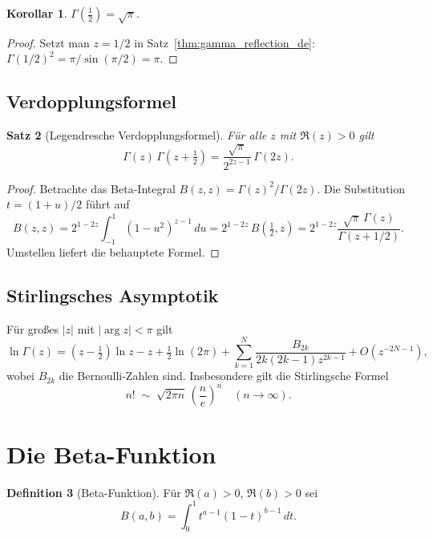 \documentclass[12pt,a4paper]{amsart}
\newtheorem{theorem}{Satz}[section]
\newtheorem{corollary}[theorem]{Korollar}
\theoremstyle{definition}
\newtheorem{definition}[theorem]{Definition}
\begin{document}
\begin{corollary}
\(\Gamma\!\left(\tfrac{1}{2}\right) = \sqrt{\pi}\).
\end{corollary}
\begin{proof}
Setzt man \(z = 1/2\) in Satz~\ref{thm:gamma_reflection_de}: \(\Gamma(1/2)^2 = \pi/\sin(\pi/2) = \pi\).
\end{proof}

\subsection{Verdopplungsformel}

\begin{theorem}[Legendresche Verdopplungsformel]\label{thm:gamma_duplication_de}
Für alle \(z\) mit \(\Re(z) > 0\) gilt
\[
  \Gamma(z)\,\Gamma\!\left(z+\tfrac{1}{2}\right)
  = \frac{\sqrt{\pi}}{2^{2z-1}}\,\Gamma(2z).
\]
\end{theorem}

\begin{proof}
Betrachte das Beta-Integral \(B(z,z) = \Gamma(z)^2/\Gamma(2z)\).  Die Substitution
\(t = (1+u)/2\) führt auf
\[
  B(z,z) = 2^{1-2z}\int_{-1}^1 (1-u^2)^{z-1}\,du = 2^{1-2z}\,B\!\left(\tfrac{1}{2},z\right)
  = 2^{1-2z}\frac{\sqrt{\pi}\,\Gamma(z)}{\Gamma(z+1/2)}.
\]
Umstellen liefert die behauptete Formel.
\end{proof}

\subsection{Stirlingsches Asymptotik}

Für großes \(|z|\) mit \(|\arg z| < \pi\) gilt
\[
  \ln\Gamma(z) = \left(z-\tfrac{1}{2}\right)\ln z - z + \tfrac{1}{2}\ln(2\pi)
  + \sum_{k=1}^N \frac{B_{2k}}{2k(2k-1)z^{2k-1}} + O\!\left(z^{-2N-1}\right),
\]
wobei \(B_{2k}\) die Bernoulli-Zahlen sind.  Insbesondere gilt die Stirlingsche Formel
\[
  n! \;\sim\; \sqrt{2\pi n}\,\left(\frac{n}{e}\right)^n \quad (n\to\infty).
\]

\section{Die Beta-Funktion}
\label{sec:beta}

\begin{definition}[Beta-Funktion]
Für \(\Re(a) > 0\), \(\Re(b) > 0\) sei
\[
  B(a,b) = \int_0^1 t^{a-1}(1-t)^{b-1}\,dt.
\]
\end{definition}
\end{document}
